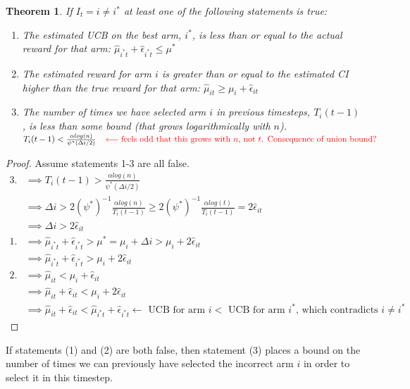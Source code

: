 \documentclass{article}
\newcommand{\eq}[1]{\begin{align*}#1\end{align*}}
\theoremstyle{plain}
\newtheorem{theorem}{Theorem}
\theoremstyle{definition}
\begin{document}
\begin{theorem} If $I_t = i \neq i^*$ at least one of the following statements is true:
\begin{enumerate}
\item The estimated UCB on the best arm, $i^*$, is less than or equal to the actual reward for that arm: $\hat{\mu}_{i^*t} + \hat{\epsilon}_{i^*t} \leq \mu^*$
\item The estimated reward for arm $i$ is greater than or equal to the estimated CI higher than the true reward for that arm: $\hat \mu_{it} \geq \mu_i + \hat \epsilon_{it}$
\item The number of times we have selected arm $i$ in previous timesteps, $T_{i}(t-1)$, is less than some bound (that grows logarithmically with $n$). $T_{i}(t-1) < \frac{\alpha log(n)}{\psi^*(\Delta i/2)} \;\;\; \color{red} \longleftarrow \text{feels odd that this grows with $n$, not $t$. Consequence of union bound?}$
\end{enumerate}
\end{theorem}
\begin{proof}
Assume statements 1-3 are all false.
\eq {
3. & \implies T_{i}(t-1) > \frac{\alpha log(n)}{\psi^*(\Delta i/2)} \\
  & \implies \Delta i > 2 (\psi^*)^{-1} \frac{\alpha log(n)}{T_{i}(t-1)} \geq 2 (\psi^*)^{-1} \frac{\alpha log(t)}{T_{i}(t-1)} = 2 \hat \epsilon_{it}\\
  & \implies \Delta i > 2 \hat \epsilon_{it} \\[10pt]
1. & \implies \hat{\mu}_{i^*t} + \hat{\epsilon}_{i^*t}  >  \mu^*  = \mu_i+\Delta i > \mu_i +  2 \hat \epsilon_{it}\\
& \implies \hat{\mu}_{i^*t} + \hat{\epsilon}_{i^*t}  > \mu_i +  2 \hat \epsilon_{it}\\[10pt]
2. & \implies \hat \mu_{it} < \mu_i + \hat \epsilon_{it} \\
   & \implies \hat \mu_{it} + \hat \epsilon_{it} < \mu_i +2 \hat \epsilon_{it} \\
   & \implies \hat \mu_{it} + \hat \epsilon_{it} <  \hat{\mu}_{i^*t} + \hat{\epsilon}_{i^*t} \longleftarrow \text { UCB for arm $i < $ UCB for arm $i^*$, which contradicts $i \neq i^*$}
}

\end{proof}

If statements (1) and (2) are both false, then statement (3) places a bound on the number of times we can previously have selected the incorrect arm $i$ in order to select it in this timestep. 
\end{document}
